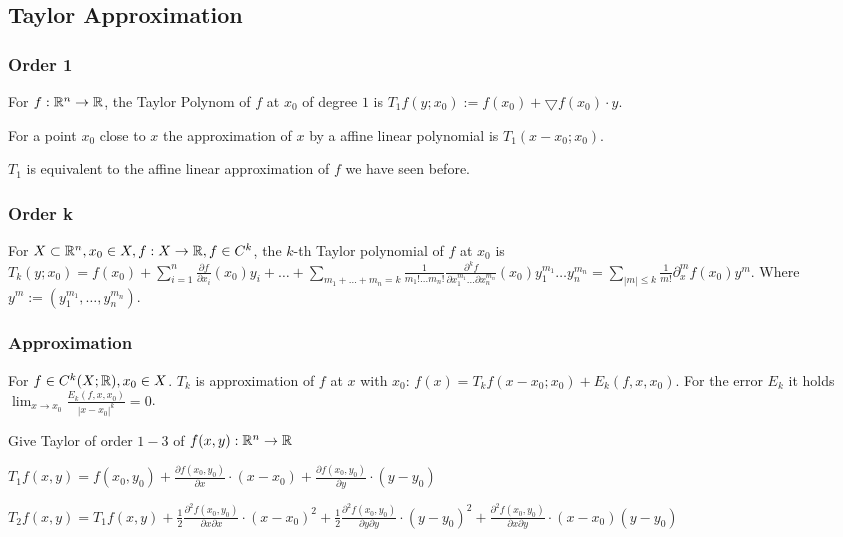 \subsection{Taylor Approximation}
\subsubsection{Order 1}
For $f: \mathbb{R}^n \to \mathbb{R}$, the Taylor Polynom of $f$ at $x_0$ of degree $1$ is $T_1f(y; x_0) := f(x_0) + \bigtriangledown f(x_0) \cdot y$.

For a point $x_0$ close to $x$ the approximation of $x$ by a affine linear polynomial is $T_1(x - x_0; x_0)$.

\begin{compactitem}
    \item $T_1$ is equivalent to the affine linear approximation of $f$ we have seen before.
\end{compactitem}

\subsubsection{Order k}
For $X \subset \mathbb{R}^n, x_0 \in X, f: X \to \mathbb{R}, f \in C^k$, the $k$-th Taylor polynomial of $f$ at $x_0$ is $T_k(y; x_0) = f(x_0) + \sum_{i=1}^{n} \frac{\partial f}{\partial x_i} (x_0) y_i + \dots + \sum_{m_1 + \dots + m_n = k} \frac{1}{m_1! \dots m_n!}\frac{\partial^k f}{\partial x_1^{m_1} \dots \partial x_n^{m_n}}(x_0)y_1^{m_1} \dots y_n^{m_n} = \sum_{|m| \le k} \frac{1}{m!} \partial_x^m f(x_0) y^m$. Where $y^m := (y_1^{m_1}, \dots , y_n^{m_n})$.

\subsubsection{Approximation}
For $f \in C^k(X; \mathbb{R}), x_0 \in X$. $T_k$ is approximation of $f$ at $x$ with $x_0$: $f(x) = T_kf(x - x_0; x_0) + E_k(f, x, x_0)$. For the error $E_k$ it holds $\lim_{x \to x_0} \frac{E_k(f, x, x_0)}{|x - x_0|^k} = 0$.

Give Taylor of order $1 - 3$ of $f(x, y): \mathbb{R}^n \to \mathbb{R}$

$T_1 f(x, y) = f(x_0, y_0) + \frac{\partial f(x_0, y_0)}{\partial x} \cdot (x - x_0) + \frac{\partial f(x_0, y_0)}{\partial y} \cdot (y - y_0)$

$T_2 f(x, y) = T_1 f(x, y) + \frac{1}{2} \frac{\partial^2 f(x_0, y_0)}{\partial x \partial x} \cdot (x - x_0)^2 + \frac{1}{2} \frac{\partial^2 f(x_0, y_0)}{\partial y \partial y} \cdot (y - y_0)^2 + \frac{\partial^2 f(x_0, y_0)}{\partial x \partial y} \cdot (x - x_0)(y - y_0)$

